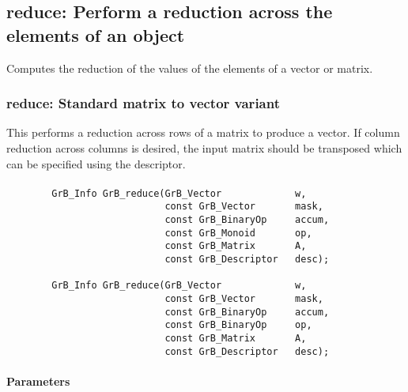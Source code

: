 



\subsection{{\sf reduce}: Perform a reduction across the elements of an object}

Computes the reduction of the values of the elements of a vector or matrix.


\subsubsection{{\sf reduce}: Standard matrix to vector variant}

This performs a reduction across rows of a matrix to produce a vector.  If column 
reduction across columns is desired, the input matrix should be transposed which can 
be specified using the descriptor.

\paragraph{\syntax}

\begin{verbatim}
        GrB_Info GrB_reduce(GrB_Vector             w,
                            const GrB_Vector       mask,
                            const GrB_BinaryOp     accum,
                            const GrB_Monoid       op,  
                            const GrB_Matrix       A,
                            const GrB_Descriptor   desc);
                            
        GrB_Info GrB_reduce(GrB_Vector             w,
                            const GrB_Vector       mask,
                            const GrB_BinaryOp     accum,
                            const GrB_BinaryOp     op,  
                            const GrB_Matrix       A,
                            const GrB_Descriptor   desc);
\end{verbatim}

\paragraph{Parameters}

